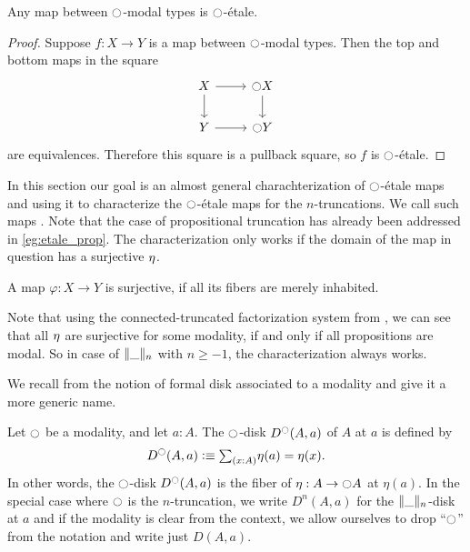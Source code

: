 \documentclass[9pt,twosided]{amsart}
\begin{document}
\begin{lem}\label{lem:etale_modal}
Any map between ${\ocircle}$-modal types is ${\ocircle}$-\'etale.
\end{lem}

\begin{proof}
Suppose $f:X\to Y$ is a map between ${\ocircle}$-modal types. Then the top and bottom maps in the square
\begin{equation*}
\begin{tikzcd}
X \arrow[r] \arrow[d] & \modal X \arrow[d] \\
Y \arrow[r] & \modal Y
\end{tikzcd}
\end{equation*}
are equivalences. Therefore this square is a pullback square, so $f$ is ${\ocircle}$-\'etale.
\end{proof}

In this section our goal is an almost general charachterization of ${\ocircle}$-étale maps and using it to characterize the ${\ocircle}$-\'etale maps for the $n$-truncations. We call such maps . Note that the case of propositional truncation has already been addressed in \cref{eg:etale_prop}.
The characterization only works if the domain of the map in question has a surjective ${\eta_{}}$.
\begin{defn}
  A map $\varphi:X\to Y$ is surjective, if all its fibers are merely inhabited.
\end{defn}
Note that using the connected-truncated factorization system from \cite{RijkeSpittersShulman}, we can see that all ${\eta_{}}$ are surjective for some modality, if and only if all propositions are modal.
So in case of $\trunc{n}{\_}$ with $n\geq -1$, the characterization always works.

We recall from \cite{wellen-thesis} the notion of formal disk associated to a modality and give it a more generic name.

\begin{defn}
  Let ${\ocircle}$ be a modality, and let $a:A$. The ${\ocircle}$-disk $D^{{\ocircle}}(A,a)$ of $A$ at $a$ is defined by
  \begin{equation*}
    D^\modal(A,a)\defeq \sm{x:A}\eta(a)=\eta(x).
  \end{equation*}
  In other words, the ${\ocircle}$-disk $D^{\ocircle}(A,a)$ is the fiber of $\eta:A\to{\ensuremath{\ocircle}} A$ at $\eta(a)$. In the special case where ${\ocircle}$ is the $n$-truncation, we write $D^n(A,a)$ for the $\trunc{n}{\_}$-disk at $a$ and if the modality is clear from the context, we allow ourselves to drop ``${\ocircle}$'' from the notation and write just $D(A,a)$.
\end{defn}
\end{document}
